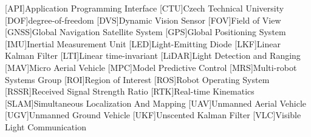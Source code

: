 
\begin{acronym}
  [API]{Application Programming Interface}
  [CTU]{Czech Technical University}
  [DOF]{degree-of-freedom}
  [DVS]{Dynamic Vision Sensor}
  [FOV]{Field of View}
  [GNSS]{Global Navigation Satellite System}
  [GPS]{Global Positioning System}
  [IMU]{Inertial Measurement Unit}
  [LED]{Light-Emitting Diode}
  [LKF]{Linear Kalman Filter}
  [LTI]{Linear time-invariant}
  [LiDAR]{Light Detection and Ranging}
  [MAV]{Micro Aerial Vehicle}
  [MPC]{Model Predictive Control}
  [MRS]{Multi-robot Systems Group}
  [ROI]{Region of Interest}
  [ROS]{Robot Operating System}
  [RSSR]{Received Signal Strength Ratio}
  [RTK]{Real-time Kinematics}
  [SLAM]{Simultaneous Localization And Mapping}
  [UAV]{Unmanned Aerial Vehicle}
  [UGV]{Unmanned Ground Vehicle}
  [UKF]{Unscented Kalman Filter}
  [VLC]{Visible Light Communication}
\end{acronym}
